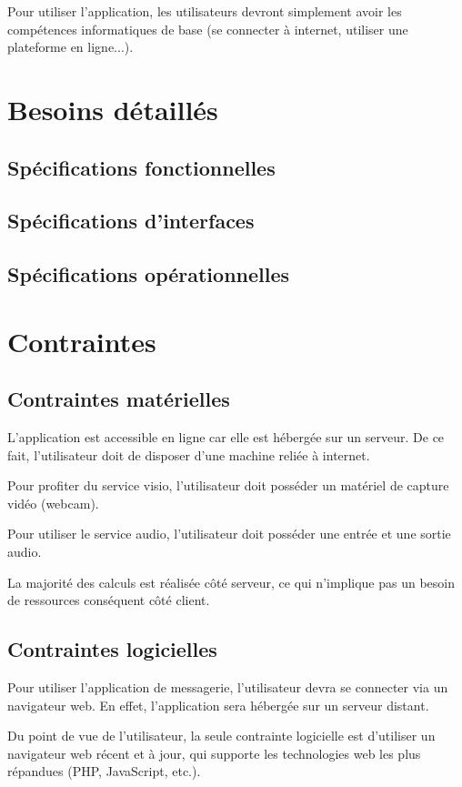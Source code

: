 \documentclass[11pt,dvipsnames,svgnames]{report}
\begin{document}
Pour utiliser l'application, les utilisateurs devront simplement avoir les compétences informatiques de base (se connecter à internet, utiliser une plateforme en ligne...).

\chapter{Besoins détaillés}
\section{Spécifications fonctionnelles}

\section{Spécifications d'interfaces}

\section{Spécifications opérationnelles}

\chapter{Contraintes}
\section{Contraintes matérielles}
L'application est accessible en ligne car elle est hébergée sur un serveur. De ce fait, l'utilisateur doit de disposer d'une machine reliée à internet.

Pour profiter du service visio, l'utilisateur doit posséder un matériel de capture vidéo (webcam).

Pour utiliser le service audio, l'utilisateur doit posséder une entrée et une sortie audio.

La majorité des calculs est réalisée côté serveur, ce qui n'implique pas un besoin de ressources conséquent côté client.

\section{Contraintes logicielles}
Pour utiliser l'application de messagerie, l'utilisateur devra se connecter via un navigateur web. En effet, l'application sera hébergée sur un serveur distant. 

Du point de vue de l'utilisateur, la seule contrainte logicielle est d'utiliser un navigateur web récent et à jour, qui supporte les technologies web les plus répandues (PHP, JavaScript, etc.).
\end{document}
